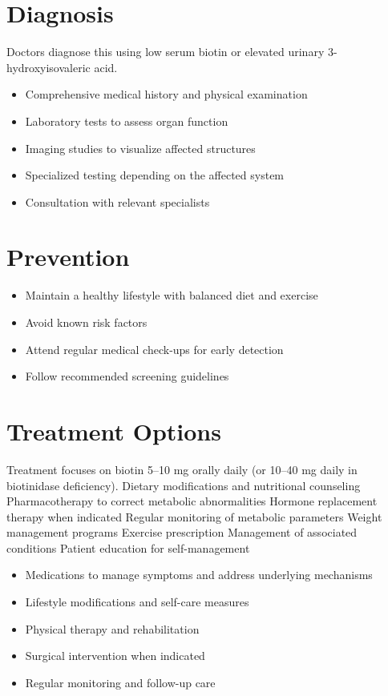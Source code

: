\section{Diagnosis}
Doctors diagnose this using low serum biotin or elevated urinary 3-hydroxyisovaleric acid.

\begin{itemize}[noitemsep]
  \item Comprehensive medical history and physical examination
  \item Laboratory tests to assess organ function
  \item Imaging studies to visualize affected structures
  \item Specialized testing depending on the affected system
  \item Consultation with relevant specialists
\end{itemize}
\section{Prevention}
\begin{itemize}[noitemsep]
  \item Maintain a healthy lifestyle with balanced diet and exercise
  \item Avoid known risk factors
  \item Attend regular medical check-ups for early detection
  \item Follow recommended screening guidelines
\end{itemize}
\section{Treatment Options}
Treatment focuses on biotin 5--10 mg orally daily (or 10--40 mg daily in biotinidase deficiency). Dietary modifications and nutritional counseling Pharmacotherapy to correct metabolic abnormalities Hormone replacement therapy when indicated Regular monitoring of metabolic parameters Weight management programs Exercise prescription Management of associated conditions Patient education for self-management

\begin{itemize}[noitemsep]
  \item Medications to manage symptoms and address underlying mechanisms
  \item Lifestyle modifications and self-care measures
  \item Physical therapy and rehabilitation
  \item Surgical intervention when indicated
  \item Regular monitoring and follow-up care
\end{itemize}
